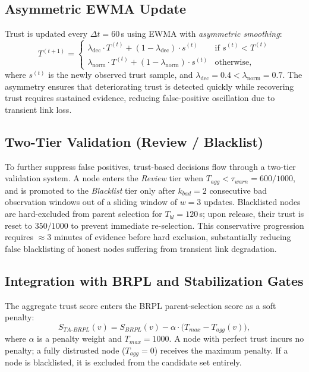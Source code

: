 \documentclass[conference]{IEEEtran}
\begin{document}
\subsection{Asymmetric EWMA Update}
\label{sec:ewma}

Trust is updated every $\Delta t = 60$\,s using EWMA with
\emph{asymmetric smoothing}:
\begin{equation}
  T^{(t+1)} =
  \begin{cases}
    \lambda_{\text{dec}} \cdot T^{(t)} + (1-\lambda_{\text{dec}})\cdot s^{(t)}
    & \text{if } s^{(t)} < T^{(t)}\\
    \lambda_{\text{norm}} \cdot T^{(t)} + (1-\lambda_{\text{norm}})\cdot s^{(t)}
    & \text{otherwise},
  \end{cases}
  \label{eq:ewma}
\end{equation}
where $s^{(t)}$ is the newly observed trust sample, and
$\lambda_{\text{dec}} = 0.4 < \lambda_{\text{norm}} = 0.7$.
The asymmetry ensures that deteriorating trust is detected quickly
while recovering trust requires sustained evidence,
reducing false-positive oscillation due to transient link loss.

\subsection{Two-Tier Validation (Review / Blacklist)}
\label{sec:tiers}

To further suppress false positives,
trust-based decisions flow through a two-tier validation system.
A node enters the \emph{Review} tier when $T_{agg} < \tau_{warn} = 600/1000$,
and is promoted to the \emph{Blacklist} tier only after
$k_{bad} = 2$ consecutive bad observation windows out of a
sliding window of $w = 3$ updates.
Blacklisted nodes are hard-excluded from parent selection for
$T_{bl} = 120$\,s; upon release, their trust is reset to $350/1000$
to prevent immediate re-selection.
This conservative progression requires $\approx 3$ minutes of evidence
before hard exclusion, substantially reducing false blacklisting of
honest nodes suffering from transient link degradation.

\subsection{Integration with BRPL and Stabilization Gates}
\label{sec:gates}

The aggregate trust score enters the BRPL parent-selection score as
a soft penalty:
\begin{equation}
  S_{TA\text{-}BRPL}(v) = S_{BRPL}(v) - \alpha\!\cdot\!\bigl(T_{max} - T_{agg}(v)\bigr),
  \label{eq:tabrpl_score}
\end{equation}
where $\alpha$ is a penalty weight and $T_{max} = 1000$.
A node with perfect trust incurs no penalty;
a fully distrusted node ($T_{agg} = 0$) receives the maximum penalty.
If a node is blacklisted, it is excluded from the candidate set entirely.
\end{document}
